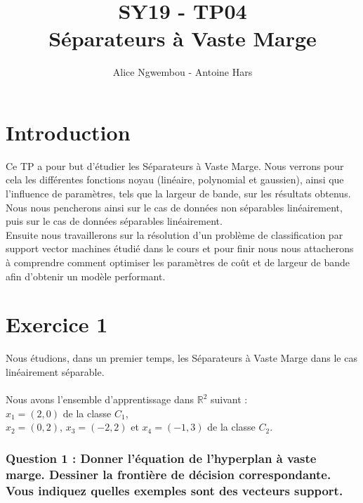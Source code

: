 \documentclass[a4paper, 10pt]{article}
\title{SY19 - TP04\\Séparateurs à Vaste Marge}
\author{Alice Ngwembou - Antoine Hars}
\begin{document}
\maketitle

\section*{Introduction}

Ce TP a pour but d’étudier les Séparateurs à Vaste Marge.
Nous verrons pour cela les différentes fonctions noyau (linéaire, polynomial et gaussien),
ainsi que l’influence de paramètres, tels que la largeur de bande, sur les résultats obtenus.\\
Nous nous pencherons ainsi sur le cas de données non séparables linéairement,
puis sur le cas de données séparables linéairement.\\
Ensuite nous travaillerons sur la résolution d'un problème de classification par support vector machines étudié dans le cours
et pour finir nous nous attacherons à comprendre comment optimiser les paramètres de coût et de largeur de bande afin d'obtenir un modèle performant.

\section*{Exercice 1}

Nous étudions, dans un premier temps, les Séparateurs à Vaste Marge dans le cas linéairement séparable.\\ \\
Nous avons l'ensemble d'apprentissage dans $\mathbb{R}^{2}$ suivant :\\
$x_{1} = (2,0)$ de la classe $C_{1}$,\\
$x_{2} = (0,2)$, $x_{3} = (-2,2)$ et $x_{4} = (-1,3)$ de la classe $C_{2}$.

\subsubsection*{Question 1 : Donner l’équation de l’hyperplan à vaste marge. Dessiner la frontière de décision
correspondante. Vous indiquez quelles exemples sont des vecteurs support.}
\end{document}
